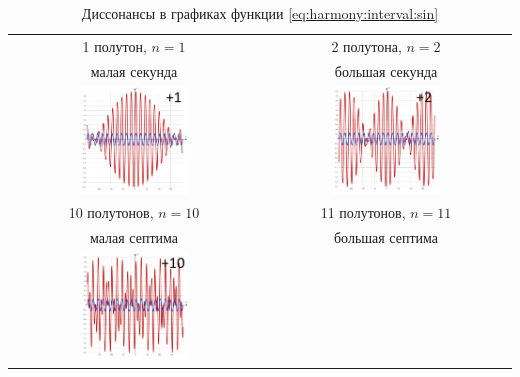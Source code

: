 \begin{table}[!ht]
    \caption{Диссонансы в графиках функции \eqref{eq:harmony:interval:sin}}
    \label{t:harmony:interval:disso-1-2-10-11}
    \centering
    \begin{tabular}{c|c}
        \hline\hline
        1 полутон, $n=1$        & 2 полутона, $n=2$ \\
        малая секунда           & большая секунда \\
        \includegraphics[width=0.45\textwidth]{fig/intervals/i01}
            & \includegraphics[width=0.45\textwidth]{fig/intervals/i02} \\
        \hline\hline
        10 полутонов, $n=10$    & 11 полутонов, $n=11$ \\
        малая септима           & большая септима \\
        \includegraphics[width=0.45\textwidth]{fig/intervals/i10}

\end{tabular}
\end{table}
